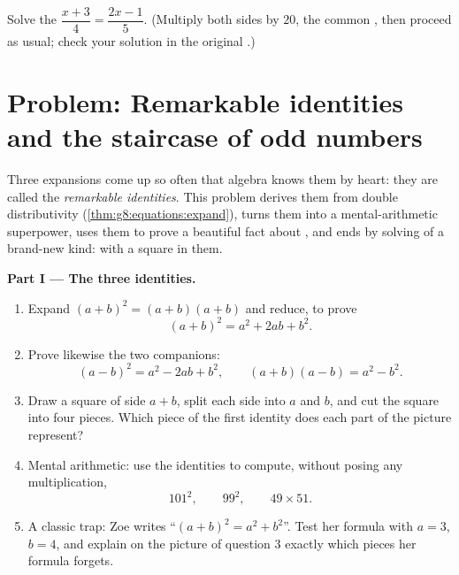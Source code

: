 \begin{exercise}[$\star\star\star$]\label{exo:g8:equations:12}
Solve the  $\dfrac{x + 3}{4} = \dfrac{2x - 1}{5}$.
(Multiply both sides by $20$, the common , then proceed as
usual; check your solution in the original .)
\end{exercise}

\section{Problem: Remarkable identities and the staircase of odd
numbers}

\begin{problem}[{Weekend problem --- $(a+b)^2$, $(a-b)^2$,
$(a+b)(a-b)$, and the sum $1 + 3 + 5 + \dots + (2n-1) = n^2$}]
\label{pb:g8:equations:1}
Three expansions come up so often that algebra knows them by
heart: they are called the \emph{remarkable identities}. This
problem derives them from double distributivity
(\cref{thm:g8:equations:expand}), turns them into a mental-arithmetic
superpower, uses them to prove a beautiful fact about ,
and ends by solving  of a brand-new kind:  with a
square in them.

\medskip
\noindent\textbf{Part I --- The three identities.}
\begin{enumerate}
  \item Expand $(a + b)^2 = (a + b)(a + b)$ and reduce, to prove
        \[
        (a + b)^2 = a^2 + 2ab + b^2 .
        \]
  \item Prove likewise the two companions:
        \[
        (a - b)^2 = a^2 - 2ab + b^2,
        \qquad
        (a + b)(a - b) = a^2 - b^2 .
        \]
  \item Draw a square of side $a + b$, split each side into $a$
        and $b$, and cut the square into four pieces. Which piece
        of the first identity does each part of the picture
        represent?
  \item Mental arithmetic: use the identities to compute, without
        posing any multiplication,
        \[
        101^2, \qquad 99^2, \qquad 49 \times 51 .
        \]
  \item A classic trap: Zoe writes ``$(a + b)^2 = a^2 + b^2$''.
        Test her formula with $a = 3$, $b = 4$, and explain on the
        picture of question 3 exactly which pieces her formula
        forgets.
\end{enumerate}


\end{problem}
